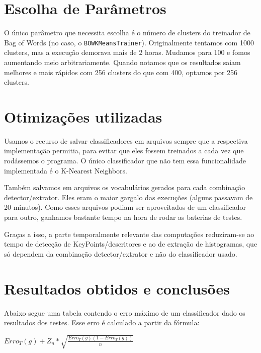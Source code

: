 \documentclass[a4paper,11pt]{article}
\begin{document}

\section{Escolha de Parâmetros}

  O único parâmetro que necessita escolha é o número de clusters do treinador de
  Bag of Words (no caso, o \verb$BOWKMeansTrainer$). Originalmente tentamos com
  1000 clusters, mas a execução demorava mais de 2 horas. Mudamos para 100 e
  fomos aumentando meio arbitrariamente. Quando notamos que os resultados saiam
  melhores e mais rápidos com 256 clusters do que com 400, optamos por 256
  clusters.

\section{Otimizações utilizadas}

  Usamos o recurso de salvar classificadores em arquivos sempre que a respectiva
  implementação permitia, para evitar que eles fossem treinados a cada vez que
  rodássemos o programa. O único classificador que não tem essa funcionalidade
  implementada é o K-Nearest Neighbors.

  Também salvamos em arquivos os vocabulários gerados para cada combinação
  detector/extrator. Eles eram o maior gargalo das execuções (alguns passavam de
  20 minutos). Como esses arquivos podiam ser aproveitados de um classificador
  para outro, ganhamos bastante tempo na hora de rodar as baterias de testes.

  Graças a isso, a parte temporalmente relevante das computações reduziram-se ao
  tempo de detecção de KeyPoints/descritores e ao de extração de histogramas,
  que só dependem da combinação detector/extrator e não do classificador usado.

\section{Resultados obtidos e conclusões}

  Abaixo segue uma tabela contendo o erro máximo de um classificador dado os
  resultados dos testes. Esse erro é calculado a partir da fórmula:

  \begin{center}
    $ Erro_T(g)+Z_n * \sqrt{\frac{Erro_T(g)(1 - Erro_T(g))}{n}} $
  \end{center}
\end{document}
